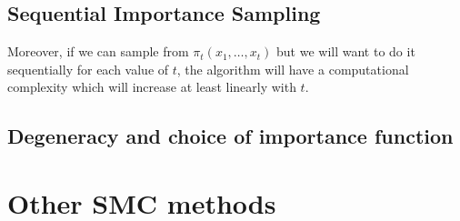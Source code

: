 \documentclass[11pt,a4paper]{article}
\begin{document}
\subsection{Sequential Importance Sampling}

Moreover, if we can sample from $\pi_t (x_1, \dots, x_t)$ but we will want to do it sequentially for each value of $t$, the algorithm will have a computational complexity which will increase at least linearly with $t$. 

\subsection{Degeneracy and choice of importance function}

\section{Other SMC methods}
\end{document}
